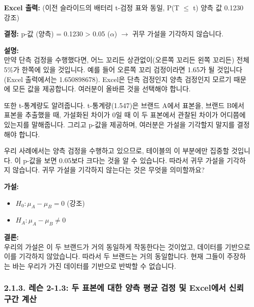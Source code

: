 \documentclass[11pt,a4paper]{article}
\begin{document}
\begin{tcolorbox}[mybox, title=Excel 워크시트 (8/9): p-값 기반 최종 결정]
\textbf{Excel 출력:} (이전 슬라이드의 배터리 t-검정 표와 동일, P(T $\le$ t) 양측 값 0.1230 강조)

\textbf{결정:}
p-값 (양측) = 0.1230 > 0.05 ($\alpha$) $\rightarrow$ 귀무 가설을 기각하지 않습니다.

\textbf{설명:} \\
만약 단측 검정을 수행했다면, 어느 꼬리든 상관없이(오른쪽 꼬리든 왼쪽 꼬리든) 전체 5\%가 한쪽에 있을 것입니다. 예를 들어 오른쪽 꼬리 검정이라면 1.65가 될 것입니다 (Excel 출력에서는 1.650898678). Excel은 단측 검정인지 양측 검정인지 모르기 때문에 모든 값을 제공합니다. 여러분이 올바른 것을 선택해야 합니다.

또한 t-통계량도 알려줍니다. t-통계량(1.547)은 브랜드 A에서 표본을, 브랜드 B에서 표본을 추출했을 때, 가설화된 차이가 0일 때 이 두 표본에서 관찰된 차이가 어디쯤에 있는지를 말해줍니다. 그리고 p-값을 제공하며, 여러분은 가설을 기각할지 말지를 결정해야 합니다.

우리 사례에서는 양측 검정을 수행하고 있으므로, 테이블의 이 부분에만 집중할 것입니다. 이 p-값을 보면 0.05보다 크다는 것을 알 수 있습니다. 따라서 귀무 가설을 기각하지 않습니다. 귀무 가설을 기각하지 않는다는 것은 무엇을 의미할까요?
\end{tcolorbox}

\begin{tcolorbox}[mybox, title=Excel 워크시트 (9/9): 최종 결론 도출]
\textbf{가설:}
\begin{itemize}
    \item $H_0 : \mu_A - \mu_B = 0$ (강조)
    \item $H_A : \mu_A - \mu_B \neq 0$
\end{itemize}
\textbf{결론:} \\
우리의 가설은 이 두 브랜드가 거의 동일하게 작동한다는 것이었고, 데이터를 기반으로 이를 기각하지 않았습니다. 따라서 두 브랜드는 거의 동일합니다. 현재 그들이 주장하는 바는 우리가 가진 데이터를 기반으로 반박할 수 없습니다.
\end{tcolorbox}

\newpage
\subsubsection*{2.1.3. 레슨 2-1.3: 두 표본에 대한 양측 평균 검정 및 Excel에서 신뢰 구간 계산}
\end{document}

